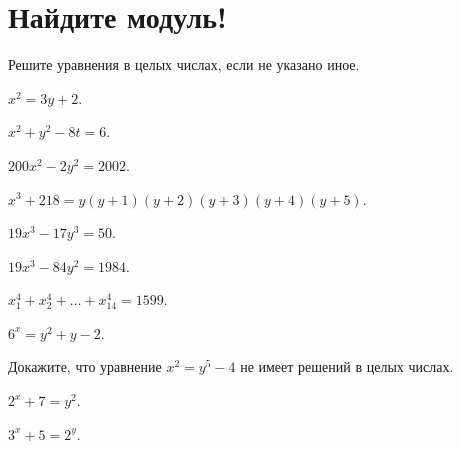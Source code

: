 
\section*{Найдите модуль!}


Решите уравнения в целых числах, если не указано иное.

\begin{problems}

$x^2 = 3 y + 2$.

\item
$x^2 + y^2 - 8 t = 6$.

\item
$200 x^2 - 2 y^2 = 2002$.

\item
$x^3 + 218 = y (y + 1) (y + 2) (y + 3) (y + 4) (y + 5)$.

\item
$19 x^3 - 17 y^3 = 50$.

\item
$19 x^3 - 84 y^2 = 1984$.

\item
$x_{1}^4 + x_{2}^4 + \ldots + x_{14}^4 = 1599$.

\item
$6^x = y^2 + y - 2$.

\item
Докажите, что уравнение $x^2 = y^5 - 4$ не имеет решений в целых числах.

\item
$2^x + 7 = y^2$.

\item
$3^x + 5 = 2^y$.

\end{problems}

